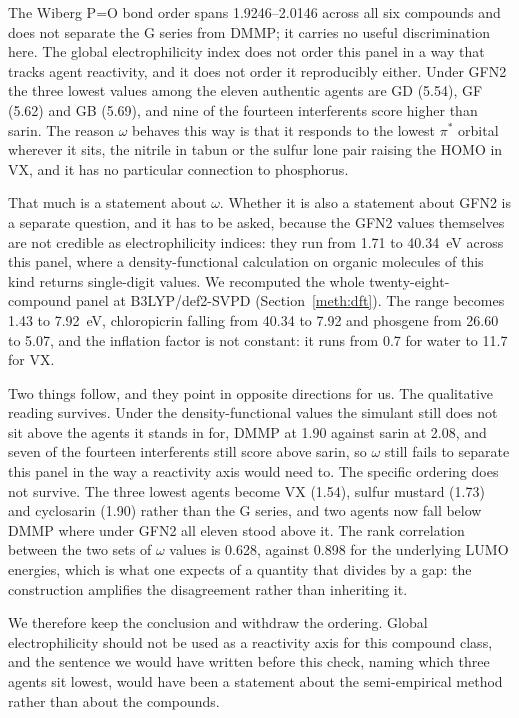 \documentclass[11pt,a4paper]{article}
\begin{document}
The Wiberg P=O bond order spans 1.9246--2.0146 across all six compounds and does
not separate the G series from DMMP; it carries no useful discrimination here.
The global electrophilicity index does not order this panel in a way that
tracks agent reactivity, and it does not order it reproducibly either. Under
GFN2 the three lowest values among the eleven authentic agents are GD (5.54),
GF (5.62) and GB (5.69), and nine of the fourteen interferents score higher
than sarin. The reason $\omega$ behaves this way is that it responds to the
lowest $\pi^{*}$ orbital wherever it sits, the nitrile in tabun or the sulfur
lone pair raising the HOMO in VX, and it has no particular connection to
phosphorus.

That much is a statement about $\omega$. Whether it is also a statement about
GFN2 is a separate question, and it has to be asked, because the GFN2 values
themselves are not credible as electrophilicity indices: they run from 1.71 to
40.34~eV across this panel, where a density-functional calculation on organic
molecules of this kind returns single-digit values. We recomputed the whole
twenty-eight-compound panel at B3LYP/def2-SVPD (Section~\ref{meth:dft}). The
range becomes 1.43 to 7.92~eV, chloropicrin falling from 40.34 to 7.92 and
phosgene from 26.60 to 5.07, and the inflation factor is not constant: it runs
from 0.7 for water to 11.7 for VX.

Two things follow, and they point in opposite directions for us. The qualitative
reading survives. Under the density-functional values the simulant still does
not sit above the agents it stands in for, DMMP at 1.90 against sarin at 2.08,
and seven of the fourteen interferents still score above sarin, so $\omega$
still fails to separate this panel in the way a reactivity axis would need to.
The specific ordering does not survive. The three lowest agents become VX
(1.54), sulfur mustard (1.73) and cyclosarin (1.90) rather than the G series,
and two agents now fall below DMMP where under GFN2 all eleven stood above it.
The rank correlation between the two sets of $\omega$ values is 0.628, against
0.898 for the underlying LUMO energies, which is what one expects of a quantity
that divides by a gap: the construction amplifies the disagreement rather than
inheriting it.

We therefore keep the conclusion and withdraw the ordering. Global
electrophilicity should not be used as a reactivity axis for this compound
class, and the sentence we would have written before this check, naming which
three agents sit lowest, would have been a statement about the semi-empirical
method rather than about the compounds.
\end{document}
